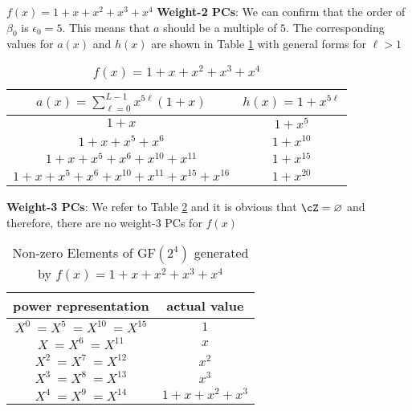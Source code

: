 



\begin{example}
$f(x)=1+x+x^2+x^3+x^4$\newline
\textbf{Weight-2 PCs}: 
We can confirm that the order of $\beta_0$ is $\epsilon_0=5$. This means that $a$ should be a multiple of $5$. The corresponding values for $a(x)$ and $h(x)$ are shown in Table \ref{novelTab3} with general forms for $\ell>1$

\begin{table}[htbp]
\caption{$f(x)=1+x+x^2+x^3+x^4$}
\centering
\begin{tabular}{c c} 
 \hline
 $a(x)=\sum_{\ell=0}^{L-1} x^{5\ell}(1+x)$ & $h(x)=1+x^{5\ell}$  \\ [0.5ex] 
 \hline\hline
$1+x$ &$1+x^5$\\ 
$1+x+x^5+x^6$ &$1+x^{10}$  \\
$1+x+x^5+x^6+x^{10}+x^{11}$ & $1+x^{15}$ \\
$1+x+x^5+x^6+x^{10}+x^{11}+x^{15}+x^{16}$ &$1+x^{20}$  
 \end{tabular}
 \label{novelTab3}
\end{table}
\newpage
\textbf{Weight-3 PCs}:
We refer to Table \ref{novelTabWt3-2} and it is obvious that $\cZ=\varnothing$ and therefore, there are no weight-3 PCs for $f(x)$
 \begin{table}[htbp]
 \caption{Non-zero Elements of GF$(2^4)$ generated by $f(x)=1+x+x^2+x^3+x^4$}
\centering
 \begin{tabular}{c c} 
 \hline
 power representation & actual value \\ [0.5ex] 
 \hline\hline
$X^0~=X^5~=X^{10}~=X^{15}$ & $1$\\
\hline
$X~=X^6~=X^{11}$ & $x$\\
\hline
$X^2~=X^7~=X^{12}$ &  $x^2$\\
\hline
$X^3~=X^8~=X^{13}$ &  $x^3$\\
\hline
$X^4~=X^9~=X^{14}$ &  $1+x+x^2+x^3$\\
\hline
 \end{tabular}
 \label{novelTabWt3-2}
\end{table}
\label{ex-2}
\end{example}

